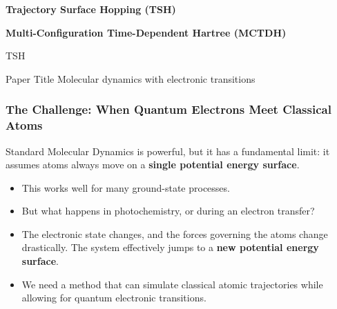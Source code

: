 \begin{frame}

    \textbf{Trajectory Surface Hopping (TSH)}
    \vspace{1.5em}
    
    \textbf{Multi-Configuration Time-Dependent Hartree (MCTDH)}
\end{frame}


\begin{frame}{TSH}
	\begin{block}{Paper Title}
	Molecular dynamics with electronic transitions
	\end{block}
\end{frame}

\begin{frame}
  \frametitle{The Challenge: When Quantum Electrons Meet Classical Atoms}
  
  Standard Molecular Dynamics is powerful, but it has a fundamental limit: it assumes atoms always move on a \textbf{single potential energy surface}. \pause
  
  \begin{itemize}
    \item This works well for many ground-state processes. \pause
    
    \item But what happens in photochemistry, or during an electron transfer? \pause
    
    \item The electronic state changes, and the forces governing the atoms change drastically. The system effectively jumps to a \textbf{new potential energy surface}. \pause
    
    \item We need a method that can simulate classical atomic trajectories while allowing for quantum electronic transitions.
  \end{itemize}
\end{frame}


